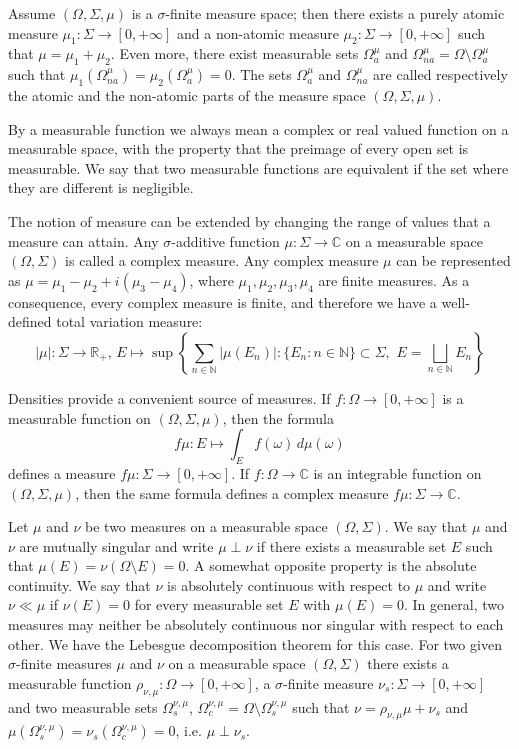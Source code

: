 Assume $(\Omega,\Sigma,\mu)$ is a $\sigma$-finite measure space; then there
exists a purely atomic measure $\mu_1:\Sigma\to[0,+\infty]$ and a non-atomic
measure $\mu_2:\Sigma\to[0,+\infty]$ such that $\mu=\mu_1+\mu_2$. Even more,
there exist measurable sets $\Omega_a^{\mu}$ and
$\Omega_{na}^{\mu}=\Omega\setminus \Omega_a^{\mu}$ such that
$\mu_1(\Omega_{na}^{\mu})=\mu_2(\Omega_a^{\mu})=0$. The sets $\Omega_a^{\mu}$
and $\Omega_{na}^{\mu}$ are called respectively the atomic and the non-atomic
parts of the measure space $(\Omega,\Sigma,\mu)$.

By a measurable function we always mean a complex or real valued function on
a measurable space, with the property that the preimage of every open set is
measurable. We say that two measurable functions are equivalent if the set where
they are different is negligible.

The notion of measure can be extended by changing the range of values that a
measure can attain. Any $\sigma$-additive function $\mu:\Sigma\to\mathbb{C}$ on
a measurable space $(\Omega,\Sigma)$ is called a complex measure. Any complex
measure $\mu$ can be represented as $\mu=\mu_1-\mu_2+i(\mu_3-\mu_4)$, where
$\mu_1,\mu_2,\mu_3,\mu_4$ are finite measures. As a consequence, every
complex measure is finite, and therefore we have a well-defined total variation
measure:
\[
|\mu|:\Sigma\to\mathbb{R}_+,\,
E\mapsto\sup\left \{\sum_{n\in\mathbb{N}}|\mu(E_n)|
: \{E_n:n\in\mathbb{N} \}\subset\Sigma,\,\, E=\bigsqcup\limits_{n\in\mathbb{N}} E_n\right \}
\]

Densities provide a convenient source of measures. If $f:\Omega\to[0,+\infty]$
is a measurable function on $(\Omega,\Sigma,\mu)$, then the formula
\[
f\mu:E\mapsto\int_{E}f(\omega)\,d\mu(\omega)
\]
defines a measure $f\mu:\Sigma\to[0,+\infty]$. If $f:\Omega\to\mathbb{C}$ is an
integrable function on $(\Omega,\Sigma,\mu)$, then the same formula defines a
complex measure $f\mu:\Sigma\to\mathbb{C}$.

Let $\mu$ and $\nu$ be two measures on a measurable space $(\Omega,\Sigma)$. We
say that $\mu$ and $\nu$ are mutually singular and write $\mu\perp\nu$ if there
exists a measurable set $E$ such that $\mu(E)=\nu(\Omega\setminus E)=0$. A somewhat 
opposite property is the absolute continuity. We say that $\nu$ is absolutely
continuous with respect to $\mu$ and write $\nu\ll\mu$ if $\nu(E)=0$ for every
measurable set $E$ with $\mu(E)=0$. In general, two measures may neither be
absolutely continuous nor singular with respect to each other. We have the
Lebesgue decomposition theorem for this case. For two given $\sigma$-finite
measures $\mu$ and $\nu$ on a measurable space $(\Omega,\Sigma)$ there exists a
measurable function $\rho_{\nu,\mu}:\Omega\to[0,+\infty]$, a $\sigma$-finite
measure $\nu_s:\Sigma\to[0,+\infty]$ and two measurable sets
$\Omega_s^{\nu,\mu}$, $\Omega_c^{\nu,\mu}=\Omega\setminus\Omega_s^{\nu,\mu}$
such that $\nu=\rho_{\nu,\mu}\mu+\nu_s$ and
$\mu(\Omega_s^{\nu,\mu})=\nu_s(\Omega_c^{\nu,\mu})=0$, i.e. $\mu\perp\nu_s$.

